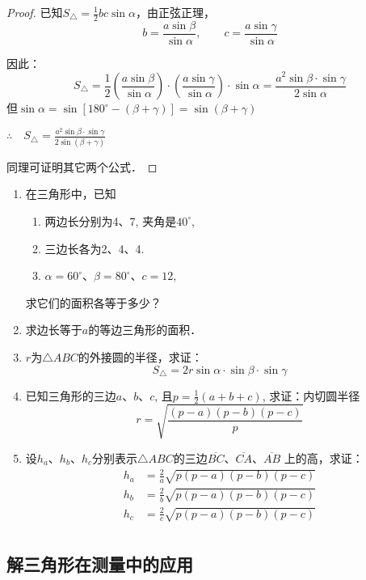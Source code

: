 \begin{proof}
已知$S_{\triangle}=\frac{1}{2}bc\sin\alpha$，由正弦正理，
\[b=\frac{a\sin \beta}{\sin\alpha},\qquad c=\frac{a\sin\gamma}{\sin\alpha}\]

因此：
\[S_{\triangle}=\frac{1}{2}\left(\frac{a\sin \beta}{\sin\alpha}\right)\cdot\left(\frac{a\sin\gamma}{\sin\alpha}\right)\cdot \sin\alpha=\frac{a^2\sin\beta\cdot \sin\gamma}{2\sin\alpha}\]
但$\sin\alpha=\sin[180^{\circ}-(\beta+\gamma)]=\sin(\beta+\gamma)$

$\therefore\quad S_{\triangle}=\frac{a^{2} \sin \beta \cdot \sin \gamma}{2 \sin (\beta+\gamma)}$

同理可证明其它两个公式．
\end{proof}


\begin{ex}
\begin{enumerate}
    \item 在三角形中，已知
\begin{enumerate}
\item 两边长分别为4、7, 夹角是$40^{\circ}$,
\item 三边长各为2、4、4.
\item $\alpha=60^{\circ}$、$\beta=80^{\circ}$、$c=12$,
\end{enumerate}
    求它们的面积各等于多少？
    \item 求边长等于$a$的等边三角形的面积．

    \item $r$为$\triangle ABC$的外接圆的半径，求证：
\[S_{\triangle}=2r \sin\alpha\cdot\sin\beta\cdot \sin\gamma\]

\item 已知三角形的三边$a$、$b$、$c$, 且$p=\frac{1}{2}(a+b+c)$, 
求证：内切圆半径
\[r=\sqrt{\frac{(p-a)(p-b)(p-c)}{p}}\]

\item 设$h_a$、$h_b$、$h_c$分别表示$\triangle ABC$的三边$\overline{BC}$、$\overline{CA}$、$\overline{AB}$
上的高，求证：
\[\begin{split}
    h_a&=\frac{2}{a}\sqrt{p(p-a)(p-b)(p-c)}\\
    h_b&=\frac{2}{b}\sqrt{p(p-a)(p-b)(p-c)}\\
    h_c&=\frac{2}{c}\sqrt{p(p-a)(p-b)(p-c)}\\
\end{split}\]
\end{enumerate}
\end{ex}

\subsection{解三角形在测量中的应用}

